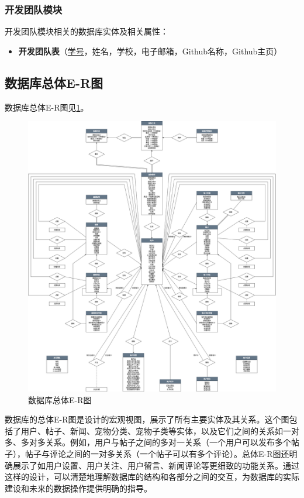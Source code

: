 \subsubsection{开发团队模块}

开发团队模块相关的数据库实体及相关属性：

\begin{itemize}
    \item \textbf{开发团队表}（\underline{学号}，姓名，学校，电子邮箱，Github名称，Github主页）
\end{itemize}

\subsection{数据库总体E-R图}

数据库总体E-R图见\cref{fig:GeneralERDiagram}。

\begin{figure}[htbp]
    \centering
    \includegraphics[width=\textwidth]{figures/GeneralERDiagram.png}
    \caption{数据库总体E-R图}
    \label{fig:GeneralERDiagram}
\end{figure}

数据库的总体E-R图是设计的宏观视图，展示了所有主要实体及其关系。这个图包括了用户、帖子、新闻、宠物分类、宠物子类等实体，以及它们之间的关系如一对多、多对多关系。例如，用户与帖子之间的多对一关系（一个用户可以发布多个帖子），帖子与评论之间的一对多关系（一个帖子可以有多个评论）。总体E-R图还明确展示了如用户设置、用户关注、用户留言、新闻评论等更细致的功能关系。通过这样的设计，可以清楚地理解数据库的结构和各部分之间的交互，为数据库的实际建设和未来的数据操作提供明确的指导。

